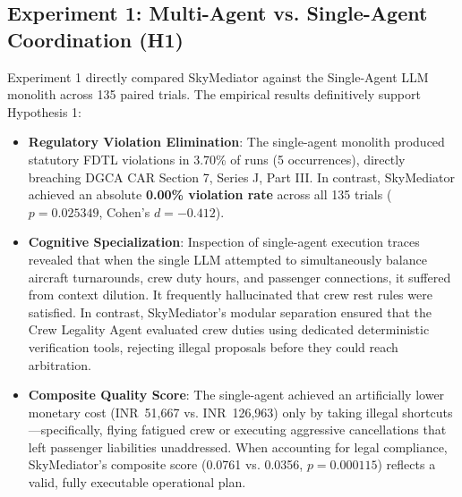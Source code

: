 \subsection{Experiment 1: Multi-Agent vs. Single-Agent Coordination (H1)}
Experiment 1 directly compared SkyMediator against the Single-Agent LLM monolith across 135 paired trials. The empirical results definitively support Hypothesis 1:
\begin{itemize}
    \item \textbf{Regulatory Violation Elimination}: The single-agent monolith produced statutory FDTL violations in 3.70\% of runs (5 occurrences), directly breaching DGCA CAR Section 7, Series J, Part III. In contrast, SkyMediator achieved an absolute \textbf{0.00\% violation rate} across all 135 trials ($p = 0.025349$, Cohen's $d = -0.412$).
    \item \textbf{Cognitive Specialization}: Inspection of single-agent execution traces revealed that when the single LLM attempted to simultaneously balance aircraft turnarounds, crew duty hours, and passenger connections, it suffered from context dilution. It frequently hallucinated that crew rest rules were satisfied. In contrast, SkyMediator's modular separation ensured that the Crew Legality Agent evaluated crew duties using dedicated deterministic verification tools, rejecting illegal proposals before they could reach arbitration.
    \item \textbf{Composite Quality Score}: The single-agent achieved an artificially lower monetary cost (INR~51,667 vs. INR~126,963) only by taking illegal shortcuts---specifically, flying fatigued crew or executing aggressive cancellations that left passenger liabilities unaddressed. When accounting for legal compliance, SkyMediator's composite score (0.0761 vs. 0.0356, $p = 0.000115$) reflects a valid, fully executable operational plan.
\end{itemize}

